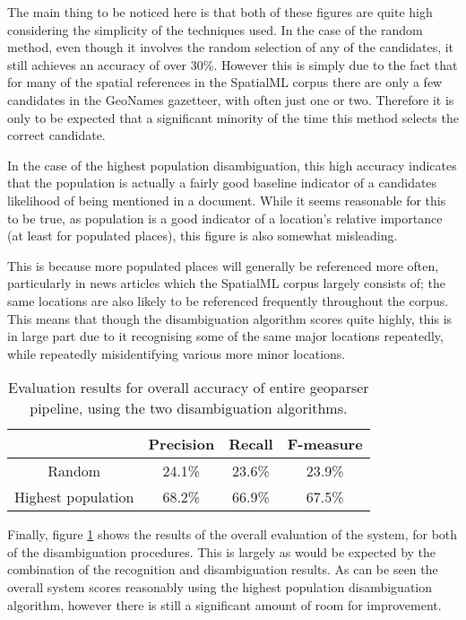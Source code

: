 \documentclass[12pt, a4paper]{report}
\begin{document}
The main thing to be noticed here is that both of these figures are quite high considering the simplicity of the techniques used. In the case of the random method, even though it involves the random selection of any of the candidates, it still achieves an accuracy of over 30\%. However this is simply due to the fact that for many of the spatial references in the SpatialML corpus there are only a few candidates in the GeoNames gazetteer, with often just one or two. Therefore it is only to be expected that a significant minority of the time this method selects the correct candidate.

In the case of the highest population disambiguation, this high accuracy indicates that the population is actually a fairly good baseline indicator of a candidates likelihood of being mentioned in a document. While it seems reasonable for this to be true, as population is a good indicator of a location's relative importance (at least for populated places), this figure is also somewhat misleading.

This is because more populated places will generally be referenced more often, particularly in news articles which the SpatialML corpus largely consists of; the same locations are also likely to be referenced frequently throughout the corpus. This means that though the disambiguation algorithm scores quite highly, this is in large part due to it recognising some of the same major locations repeatedly, while repeatedly misidentifying various more minor locations.

\begin{table}[H]
	\centering
	\begin{tabular}{| c | c | c | c |}
		\hline
		& Precision & Recall & F-measure \\ \hline
		Random & 24.1\% & 23.6\% & 23.9\% \\ \hline
		Highest population & 68.2\% & 66.9\% & 67.5\% \\ \hline
	\end{tabular}
	\caption{ Evaluation results for overall accuracy of entire geoparser pipeline, using the two disambiguation algorithms. }
	\label{table:overall}
\end{table}

Finally, figure \ref{table:overall}	shows the results of the overall evaluation of the system, for both of the disambiguation procedures. This is largely as would be expected by the combination of the recognition and disambiguation results. As can be seen the overall system scores reasonably using the highest population disambiguation algorithm, however there is still a significant amount of room for improvement.
\end{document}
